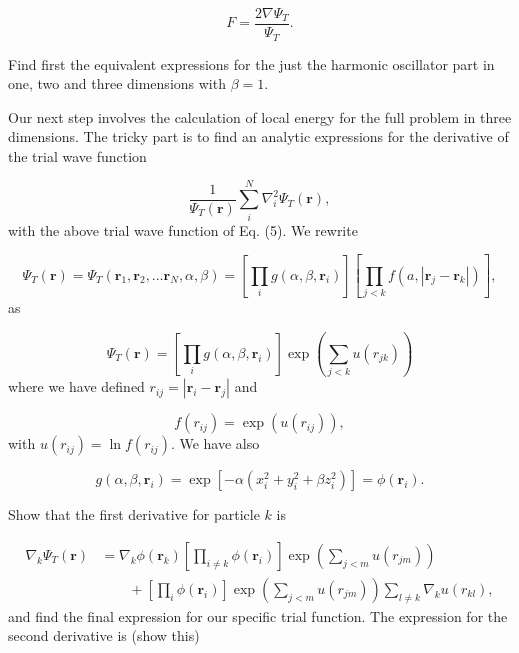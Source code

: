 \documentclass[%
oneside,                 %
final,                   %
10pt]{article}
\begin{document}
\begin{equation}
   F = \frac{2\nabla \Psi_T}{\Psi_T}.
 \end{equation}

Find first the equivalent expressions for the just the harmonic oscillator part in one, two and three dimensions
with $\beta=1$. 

Our next step involves the calculation of local energy for the full problem in three dimensions.
The tricky part is to find an analytic expressions for the derivative of the trial wave function

\begin{equation*}
   \frac{1}{\Psi_T(\mathbf{r})}\sum_i^{N}\nabla_i^2\Psi_T(\mathbf{r}),
\end{equation*}
with the above 
trial wave function of Eq. (5).
We rewrite 

\begin{equation*}
\Psi_T(\mathbf{r})=\Psi_T(\mathbf{r}_1, \mathbf{r}_2, \dots \mathbf{r}_N,\alpha,\beta)
=\left[
    \prod_i g(\alpha,\beta,\mathbf{r}_i)
\right]
\left[
    \prod_{j<k}f(a,|\mathbf{r}_j-\mathbf{r}_k|)
\right],
\end{equation*}
as

\begin{equation*}
\Psi_T(\mathbf{r})=\left[
    \prod_i g(\alpha,\beta,\mathbf{r}_i)
\right]
\exp{\left(\sum_{j<k}u(r_{jk})\right)}
\end{equation*}
where we have defined $r_{ij}=|\mathbf{r}_i-\mathbf{r}_j|$
and

\begin{equation*}
   f(r_{ij})= \exp{\left(u(r_{ij})\right)},
\end{equation*}
with $u(r_{ij})=\ln{f(r_{ij})}$.
We have also

\begin{equation*}
    g(\alpha,\beta,\mathbf{r}_i) = \exp{\left[-\alpha(x_i^2+y_i^2+\beta
    z_i^2)\right]}= \phi(\mathbf{r}_i).
\end{equation*}

Show that the first  derivative for particle $k$ is

\begin{align*}
  \nabla_k\Psi_T(\mathbf{r}) &= \nabla_k\phi(\mathbf{r}_k)\left[\prod_{i\ne k}\phi(\mathbf{r}_i)\right]\exp{\left(\sum_{j<m}u(r_{jm})\right)}
  \\
  &\qquad
  +  \left[\prod_i\phi(\mathbf{r}_i)\right]
  \exp{\left(\sum_{j<m}u(r_{jm})\right)}\sum_{l\ne k}\nabla_k u(r_{kl}),
\end{align*}
and find the final expression for our specific trial function.
The expression for the second derivative is (show this)
\end{document}

